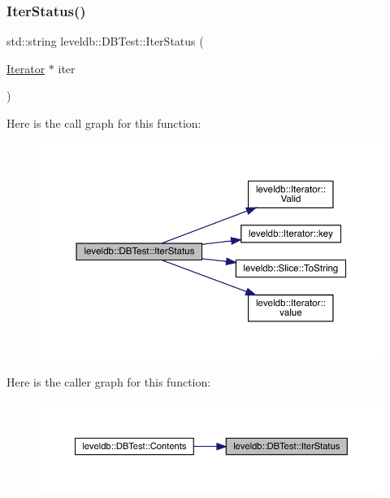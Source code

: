 \subsubsection{\texorpdfstring{IterStatus()}{IterStatus()}}
{\footnotesize\ttfamily std\+::string leveldb\+::\+D\+B\+Test\+::\+Iter\+Status (\begin{DoxyParamCaption}\item[{\mbox{\hyperlink{classleveldb_1_1_iterator}{Iterator}} $\ast$}]{iter }\end{DoxyParamCaption})\hspace{0.3cm}{\ttfamily [inline]}}

Here is the call graph for this function\+:
\nopagebreak
\begin{figure}[H]
\begin{center}
\leavevmode
\includegraphics[width=350pt]{classleveldb_1_1_d_b_test_ad162fa0f5a31e61ee94ba9f45af716f8_cgraph}
\end{center}
\end{figure}
Here is the caller graph for this function\+:
\nopagebreak
\begin{figure}[H]
\begin{center}
\leavevmode
\includegraphics[width=350pt]{classleveldb_1_1_d_b_test_ad162fa0f5a31e61ee94ba9f45af716f8_icgraph}
\end{center}
\end{figure}
\mbox{\label{classleveldb_1_1_d_b_test_ace931478fa5ad2c48a8aa95a344e19fd}} 
